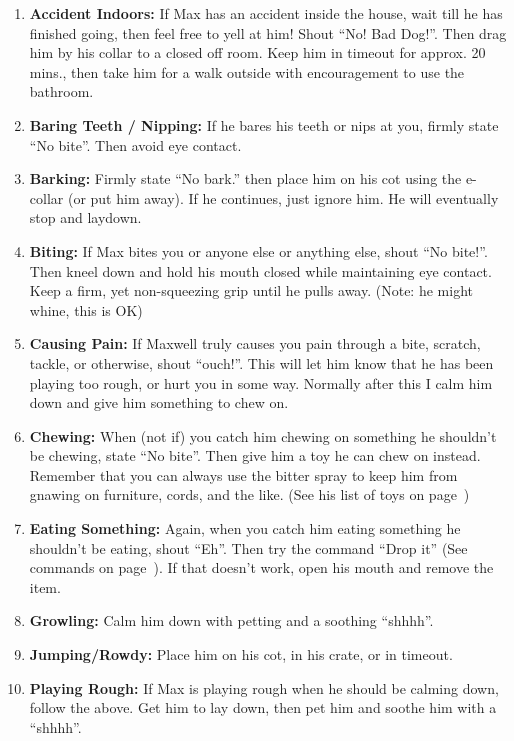 \documentclass[pdftex,12pt]{article}
\begin{document}
\begin{enumerate}\label{itm:discipline}
    \item \textbf{Accident Indoors:} If Max has an accident inside the house, wait till he has finished going, then feel free to yell at him!
        Shout ``No!  Bad Dog!''.
        Then drag him by his collar to a closed off room.
        Keep him in timeout for approx. 20 mins., then take him for a walk outside with encouragement to use the bathroom.
    \item \textbf{Baring Teeth / Nipping:} If he bares his teeth or nips at you, firmly state ``No bite''.
        Then avoid eye contact.
    \item \textbf{Barking:} Firmly state ``No bark.'' then place him on his cot using the e-collar (or put him away).
        If he continues, just ignore him.
        He will eventually stop and laydown.
    \item \textbf{Biting:} If Max bites you or anyone else or anything else, shout ``No bite!''.
        Then kneel down and hold his mouth closed while maintaining eye contact.
        Keep a firm, yet non-squeezing grip until he pulls away.
        (Note: he might whine, this is OK)
    \item \textbf{Causing Pain:} If Maxwell truly causes you pain through a bite, scratch, tackle, or otherwise, shout ``ouch!''.
        This will let him know that he has been playing too rough, or hurt you in some way.
        Normally after this I calm him down and give him something to chew on.
    \item \textbf{Chewing:} When (not if) you catch him chewing on something he shouldn't be chewing, state ``No bite''.
        Then give him a toy he can chew on instead.
        Remember that you can always use the bitter spray to keep him from gnawing on furniture, cords, and the like.
        (See his list of toys on page~\pageref{itm:included_items})
    \item \textbf{Eating Something:} Again, when you catch him eating something he shouldn't be eating, shout ``Eh''.
        Then try the command ``Drop it'' (See commands on page~\pageref{tab:commands}).
        If that doesn't work, open his mouth and remove the item.
    \item \textbf{Growling:} Calm him down with petting and a soothing ``shhhh''.
    \item \textbf{Jumping/Rowdy:} Place him on his cot, in his crate, or in timeout.
    \item \textbf{Playing Rough:} If Max is playing rough when he should be calming down, follow the above.
        Get him to lay down, then pet him and soothe him with a ``shhhh''.
\end{enumerate}
\end{document}
